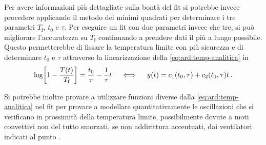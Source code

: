         Per avere informazioni più dettagliate sulla bontà del fit si potrebbe invece procedere applicando il metodo dei minimi quadrati per determinare i tre parametri $T_\text{f}$, $t_0$ e $\tau$. Per eseguire un fit con due parametri invece che tre, si può migliorare l'accuratezza su $T_\text{f}$ continuando a prendere dati il più a lungo possibile. Questo permetterebbe di fissare la temperatura limite con più sicurezza e di determinare $t_0$ e $\tau$ attraverso la linearizzazione della \eqref{eq:ard:temp-analitica} in
        \begin{equation*}
            \log\!\bqty{1-\frac{T\pqty{t}}{T_\text{f}}} = \frac{t_0}{\tau} - \frac{1}{\tau}t 
            \quad\iff\quad 
            y\pqty{t} = c_1\pqty{t_0,\tau} + c_2\pqty{t_0,\tau}t
            \myperiod
        \end{equation*}

        Si potrebbe inoltre provare a utilizzare funzioni diverse dalla \eqref{eq:ard:temp-analitica} nel fit per provare a modellare quantitativamente le oscillazioni che si verificano in prossimità della temperatura limite, possibilmente dovute a moti convettivi non del tutto smorzati, se non addirittura accentuati, dai ventilatori indicati al punto .
        